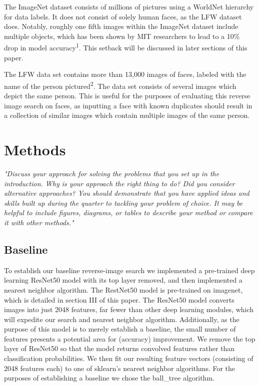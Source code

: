 \documentclass[conference]{IEEEtran}
\begin{document}
The ImageNet dataset consists of millions of pictures using a WorldNet hierarchy for data labels. It does not consist of solely human faces, as the LFW dataset does. Notably, roughly one fifth images within the ImageNet dataset include multiple objects, which has been shown by MIT researchers to lead to a 10\% drop in model accuracy\textsuperscript{1}. This setback will be discussed in later sections of this paper.

The LFW data set contains more than 13,000 images of faces, labeled with the name of the person pictured\textsuperscript{2}. The data set consists of several images which depict the same person. This is useful for the purposes of evaluating this reverse image search on faces, as inputting a face with known duplicates should result in a collection of similar images which contain multiple images of the same person.

\section{Methods}
\textit{"Discuss your approach for solving the problems that you set up in the introduction. Why is your approach the right thing to do? Did you consider alternative approaches? You should demonstrate that you have applied ideas and skills built up during the quarter to tackling your problem of choice. It may be helpful to include figures, diagrams, or tables to describe your method or compare it with other methods."}

\subsection{Baseline}
To establish our baseline reverse-image search we implemented a pre-trained deep learning ResNet50 model with its top layer removed, and then implemented a nearest neighbor algorithm. The RestNet50 model is pre-trained on imagenet, which is detailed in section III of this paper. The ResNet50 model converts images into just 2048 features, far fewer than other deep learning modules, which will expedite our search and nearest neighbor algorithm. Additionally, as the purpose of this model is to merely establish a baseline, the small number of features presents a potential area for (accuracy) improvement. We remove the top layer of ResNet50 so that the model returns convolved features rather than classification probabilities. We then fit our resulting feature vectors (consisting of 2048 features each) to one of sklearn's nearest neighbor algorithms. For the purposes of establishing a baseline we chose the ball\_tree algorithm. 
\end{document}
